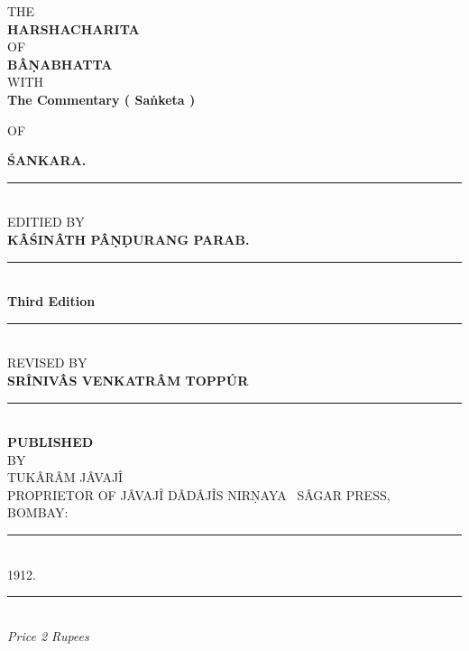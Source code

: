 \documentclass[11pt, openany]{book}
\begin{document}
\cfoot{}

\begin{center}
\onehalfspacing

THE\\

\vspace{3mm}
\textbf{\huge HARSHACHARITA}\\

\vspace{3mm}
OF\\

\vspace{3mm}
\textbf{\LARGE BÂṆABHATTA}\\

WITH\\

\textbf{\large The Commentary ( Saṅketa )}

OF

\textbf{\large ŚANKARA.}\\

\rule{0.2\linewidth}{0.5pt}\\

\vspace{5mm}
EDITIED BY\\

\textbf{\large KÂŚINÂTH PÂṆḌURANG PARAB.}\\

\rule{0.2\linewidth}{0.5pt}\\

\textbf{Third Edition}\\

\rule{0.2\linewidth}{0.5pt}\\

REVISED BY\\

\textbf{\large SRÎNIVÂS VENKATRÂM TOPPÚR}\\

\rule{0.2\linewidth}{0.5pt}\\

\textbf{PUBLISHED}\\

\vspace{2mm}
BY\\

\vspace{2mm}
{\large TUKÂRÂM JÂVAJÎ}\\

\vspace{2mm}
PROPRIETOR OF JÂVAJÎ DÂDÂJÎS {\qt NIRṆAYA \textendash\ SÂGAR} PRESS,\\

\vspace{2mm}
BOMBAY:

\rule{0.1\linewidth}{0.5pt}\\

1912.\\

\rule{0.1\linewidth}{0.5pt}\\

\emph{\en Price 2 Rupees}
\end{center}
\end{document}
